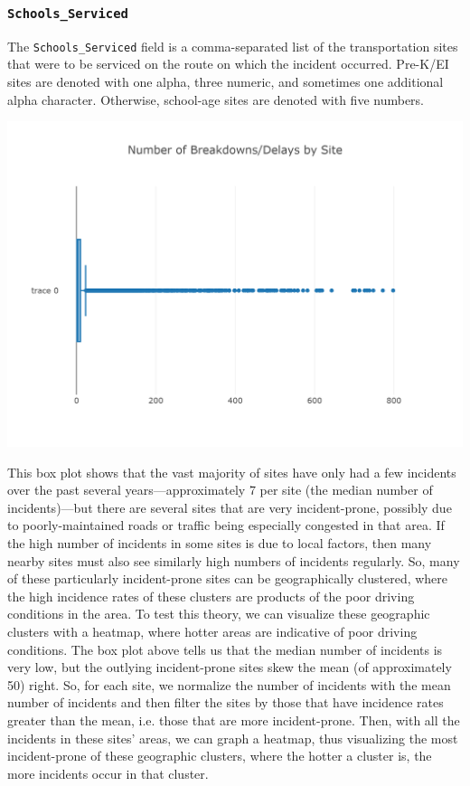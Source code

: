\documentclass[11pt]{article}
\begin{document}
\subsubsection{\texttt{Schools\_Serviced}}
The \texttt{Schools\_Serviced} field is a comma-separated list of the transportation sites that were to be serviced on the route on which the incident occurred. Pre-K/EI sites are denoted with one alpha, three numeric, and sometimes one additional alpha character. Otherwise, school-age sites are denoted with five numbers.
\begin{center}
\includegraphics[width=5.25in]{images/schools_serviced.png}
\end{center}
This box plot shows that the vast majority of sites have only had a few incidents over the past several years---approximately 7 per site (the median number of incidents)---but there are several sites that are very incident-prone, possibly due to poorly-maintained roads or traffic being especially congested in that area. If the high number of incidents in some sites is due to local factors, then many nearby sites must also see similarly high numbers of incidents regularly. So, many of these particularly incident-prone sites can be geographically clustered, where the high incidence rates of these clusters are products of the poor driving conditions in the area. To test this theory, we can visualize these geographic clusters with a heatmap, where hotter areas are indicative of poor driving conditions. The box plot above tells us that the median number of incidents is very low, but the outlying incident-prone sites skew the mean (of approximately 50) right. So, for each site, we normalize the number of incidents with the mean number of incidents and then filter the sites by those that have incidence rates greater than the mean, i.e. those that are more incident-prone. Then, with all the incidents in these sites' areas, we can graph a heatmap, thus visualizing the most incident-prone of these geographic clusters, where the hotter a cluster is, the more incidents occur in that cluster.
\end{document}
